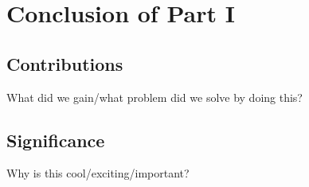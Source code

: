 \chapter{Conclusion of Part I}

	\section{Contributions}
		\begin{mainpoint}
			What did we gain/what problem did we solve by doing this?
		\end{mainpoint}

	\section{Significance}
		\begin{mainpoint}
			Why is this cool/exciting/important?
		\end{mainpoint}
